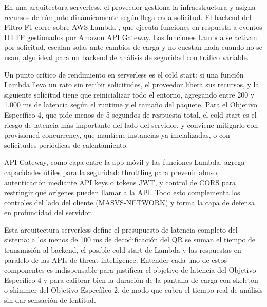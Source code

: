 En una arquitectura serverless, el proveedor gestiona la infraestructura y asigna recursos de c\'omputo din\'amicamente seg\'un llega cada solicitud. El backend del Filtro F1 corre sobre AWS Lambda \cite{aws_lambda_dg}, que ejecuta funciones en respuesta a eventos HTTP gestionados por Amazon API Gateway. Las funciones Lambda se activan por solicitud, escalan solas ante cambios de carga y no cuestan nada cuando no se usan, algo ideal para un backend de an\'alisis de seguridad con tr\'afico variable.

Un punto cr\'itico de rendimiento en serverless es el cold start: si una funci\'on Lambda lleva un rato sin recibir solicitudes, el proveedor libera sus recursos, y la siguiente solicitud tiene que reinicializar todo el entorno, agregando entre 200 y 1.000 ms de latencia seg\'un el runtime y el tama\~no del paquete. Para el Objetivo Espec\'ifico 4, que pide menos de 5 segundos de respuesta total, el cold start es el riesgo de latencia m\'as importante del lado del servidor, y conviene mitigarlo con provisioned concurrency, que mantiene instancias ya inicializadas, o con solicitudes peri\'odicas de calentamiento.

API Gateway, como capa entre la app m\'ovil y las funciones Lambda, agrega capacidades \'utiles para la seguridad: throttling para prevenir abuso, autenticaci\'on mediante API keys o tokens JWT, y control de CORS para restringir qu\'e or\'igenes pueden llamar a la API. Todo esto complementa los controles del lado del cliente (MASVS-NETWORK) y forma la capa de defensa en profundidad del servidor.

Esta arquitectura serverless define el presupuesto de latencia completo del sistema: a los menos de 100 ms de decodificaci\'on del QR se suman el tiempo de transmisi\'on al backend, el posible cold start de Lambda y las respuestas en paralelo de las APIs de threat intelligence. Entender cada uno de estos componentes es indispensable para justificar el objetivo de latencia del Objetivo Espec\'ifico 4 y para calibrar bien la duraci\'on de la pantalla de carga con skeleton o shimmer del Objetivo Espec\'ifico 2, de modo que cubra el tiempo real de an\'alisis sin dar sensaci\'on de lentitud.
